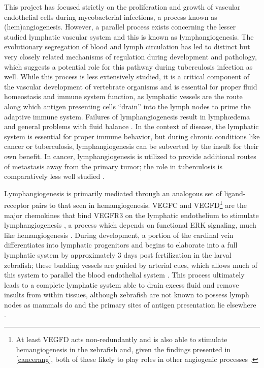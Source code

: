 This project has focused strictly on the proliferation and growth of vascular endothelial cells during mycobacterial infections, a process known as (hem)angiogenesis. However, a parallel process exists concerning the lesser studied lymphatic vascular system and this is known as lymphangiogenesis. The evolutionary segregation of blood and lymph circulation has led to distinct but very closely related mechanisms of regulation during development and pathology, which suggests a potential role for this pathway during tuberculosis infection as well. While this process is less extensively studied, it is a critical component of the vascular development of vertebrate organisms and is essential for proper fluid homeostasis and immune system function, as lymphatic vessels are the route along which antigen presenting cells ``drain'' into the lymph nodes to prime the adaptive immune system. Failures of lymphangiogenesis result in lymph\oe dema and general problems with fluid balance \citep{Makinen2001}. In the context of disease, the lymphatic system is essential for proper immune behavior, but during chronic conditions like cancer or tuberculosis, lymphangiogenesis can be subverted by the insult for their own benefit. In cancer, lymphangiogenesis is utilized to provide additional routes of metastasis away from the primary tumor; the role in tuberculosis is comparatively less well studied \citep{Huang2010, Augustin2009, Duong2012, Stacker2014}.

Lymphangiogenesis is primarily mediated through an analogous set of ligand\hyp{}receptor pairs to that seen in hemangiogenesis. VEGFC and VEGFD\footnote{At least VEGFD acts non\hyp{}redundantly and is also able to stimulate hemangiogenesis in the zebrafish and, given the findings presented in \autoref{cancerang}, both of these likely to play roles in other angiogenic processes \citep{Bower2017a}.} are the major  chemokines that bind VEGFR3 on the lymphatic endothelium to stimulate lymphangiogenesis \citep{Alitalo2005, Kuchler2006, Haiko2008}, a process which depends on functional ERK signaling, much like hemangiogenesis \citep{Shin2017, Shin2016}. During development, a portion of the cardinal vein differentiates into lymphatic progenitors \citep{Yaniv2006, Nicenboim2015} and begins to elaborate into a full lymphatic system by approximately 3 days post fertilization in the larval zebrafish; these budding vessels are guided by arterial cues, which allows much of this system to parallel the blood endothelial system \citep{Jung2017, Bussmann2010}. This process ultimately leads to a complete lymphatic system able to drain excess fluid and remove insults from within tissues, although zebrafish are not known to possess lymph nodes as mammals do and the primary sites of antigen presentation lie elsewhere \citep{vanLessen2017, Onder2017}.


